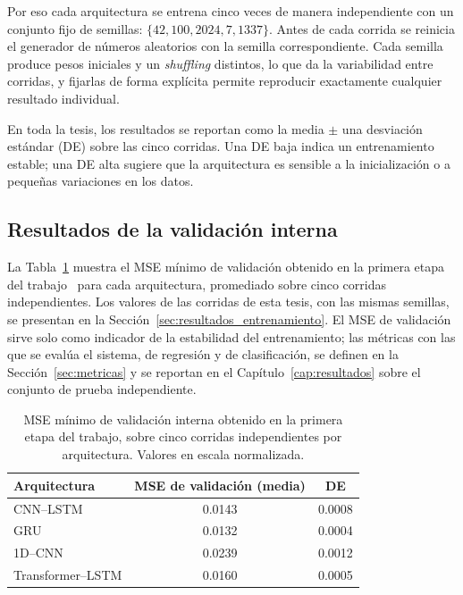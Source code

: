 \documentclass{report}
\begin{document}
Por eso cada arquitectura se entrena cinco veces de manera independiente con un conjunto fijo de semillas: $\{42, 100, 2024, 7, 1337\}$. Antes de cada corrida se reinicia el generador de números aleatorios con la semilla correspondiente. Cada semilla produce pesos iniciales y un \textit{shuffling} distintos, lo que da la variabilidad entre corridas, y fijarlas de forma explícita permite reproducir exactamente cualquier resultado individual.

En toda la tesis, los resultados se reportan como la media $\pm$ una desviación estándar (DE) sobre las cinco corridas. Una DE baja indica un entrenamiento estable; una DE alta sugiere que la arquitectura es sensible a la inicialización o a pequeñas variaciones en los datos.

\subsection{Resultados de la validación interna}
\label{subsec:resultados_validacion_interna}

La Tabla~\ref{tab:val_mse} muestra el MSE mínimo de validación obtenido en la primera etapa del trabajo~\cite{sanchez2025imputation} para cada arquitectura, promediado sobre cinco corridas independientes. Los valores de las corridas de esta tesis, con las mismas semillas, se presentan en la Sección~\ref{sec:resultados_entrenamiento}. El MSE de validación sirve solo como indicador de la estabilidad del entrenamiento; las métricas con las que se evalúa el sistema, de regresión y de clasificación, se definen en la Sección~\ref{sec:metricas} y se reportan en el Capítulo~\ref{cap:resultados} sobre el conjunto de prueba independiente.

\begin{table}[h]
    \centering
    \caption{MSE mínimo de validación interna obtenido en la primera etapa del trabajo, sobre cinco corridas independientes por arquitectura. Valores en escala normalizada.}
    \label{tab:val_mse}
    \begin{tabular}{lcc}
        \toprule
        \textbf{Arquitectura} & \textbf{MSE de validación (media)} & \textbf{DE} \\
        \midrule
        CNN--LSTM           & 0.0143 & 0.0008 \\
        GRU                 & 0.0132 & 0.0004 \\
        1D--CNN             & 0.0239 & 0.0012 \\
        Transformer--LSTM   & 0.0160 & 0.0005 \\
        \bottomrule
    \end{tabular}
\end{table}
\end{document}
